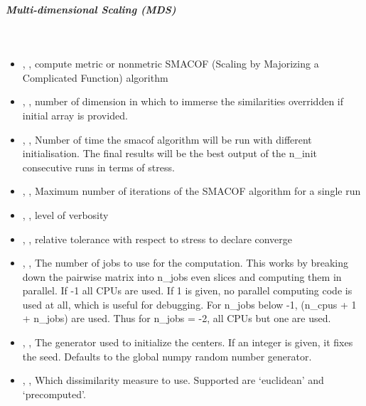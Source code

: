 \subparagraph{Multi-dimensional Scaling (MDS)} \hfil \\
\label{subparagraph:MDS}

\begin{itemize}
	\item {}, , compute metric or nonmetric SMACOF
	 (Scaling by Majorizing a Complicated Function) algorithm 
	\item {}, , number of dimension in
	which to immerse the similarities overridden if initial array is provided. 
	\item {}, , Number of time the smacof
	algorithm will be run with different initialisation. The final results will be the best
	 output of the n\_init consecutive runs in terms of stress. 
	\item {}, , Maximum number of iterations
	of the SMACOF algorithm for a single run 
	\item {}, , level of verbosity 
	\item {}, , relative tolerance with respect
	to stress to declare converge 
	\item {}, , The number of jobs to use for
	the computation. This works by breaking down the pairwise matrix into n\_jobs even slices
	 and computing them in parallel. If -1 all CPUs are used. If 1 is given, no parallel
	 computing code is used at all, which is useful for debugging. For n\_jobs below -1,
	(n\_cpus + 1 + n\_jobs) are used. Thus for n\_jobs = -2, all CPUs but one are used.
	\item {}, ,
	The generator used to initialize the centers. If an integer is given, it fixes the seed.
	Defaults to the global numpy random number generator. 
	\item {}, , Which dissimilarity
	measure to use. Supported are ‘euclidean’ and ‘precomputed’. 
\end{itemize}
